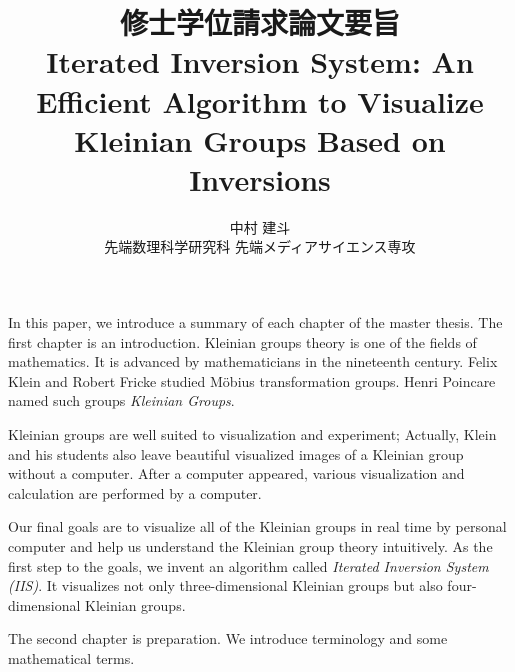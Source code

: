 \documentclass[uplatex, dvipdfmx]{article}
\title{修士学位請求論文要旨\\
 Iterated Inversion System: An Efficient Algorithm to Visualize Kleinian Groups Based on Inversions }
\author{中村 建斗\\
先端数理科学研究科 先端メディアサイエンス専攻\\
}
\date{}
\begin{document}
\maketitle
\pagestyle{plain}
\newpage

In this paper, we introduce a summary of each chapter of the master thesis.
The first chapter is an introduction.
Kleinian groups theory is one of the fields of mathematics.
It is advanced by mathematicians in the nineteenth century.
Felix Klein and Robert Fricke studied M\"obius
transformation groups.
Henri Poincare named such groups \textit{Kleinian Groups}.

Kleinian groups are well suited to visualization and
experiment; Actually, Klein and his students also leave beautiful
visualized images of a Kleinian group without a computer.
After a computer appeared, various visualization and calculation are
performed by a computer.

Our final goals are to visualize all of the Kleinian groups in real time
by personal computer and help us understand the Kleinian group theory
intuitively.
As the first step to the goals, we invent an algorithm called
\textit{Iterated Inversion System (IIS)}.
It visualizes not only three-dimensional Kleinian groups but also
four-dimensional Kleinian groups.

The second chapter is preparation.
We introduce terminology and some mathematical terms.
\end{document}
